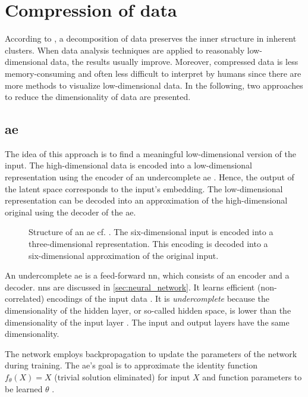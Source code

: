 \section{Compression of data}\label{sec:compression}

According to \citeauthor{clusteringDocs2020}, a decomposition of data preserves the inner structure in inherent clusters. 
When data analysis techniques are applied to reasonably low-dimensional data, the results usually improve.
Moreover, compressed data is less memory-consuming and often less difficult to interpret by humans 
since there are more methods to visualize low-dimensional data.
In the following, two approaches to reduce the dimensionality of data are presented.

\subsection{\acl*{ae}}\label{subsec:autoencoder}

The idea of this approach is to find a meaningful low-dimensional version of the input.
The high-dimensional data is encoded into a low-dimensional representation using the encoder of an undercomplete \ac{ae} \cite{autoencoder2020}.
Hence, the output of the latent space corresponds to the input's embedding. 
The low-dimensional representation can be decoded into an approximation of the high-dimensional original using the decoder of the \ac{ae}.

\begin{figure}[!htp] %
    \centering
    
    \caption[Structure of an \ac{ae}]
    {Structure of an \acs*{ae} cf. \cite{autoencoder2020}.
    The six-dimensional input is encoded into a three-dimensional representation.
    This encoding is decoded into a six-dimensional approximation of the original input.}
    \label{fig:ae}
\end{figure}

An undercomplete \ac{ae} is a feed-forward \ac{nn}, which consists of an encoder and a decoder.
\acp{nn} are discussed in \autoref{sec:neural_network}.
It learns efficient (non-correlated) encodings of the input data \cite{autoencoder2020}.
It is \textit{undercomplete} because the dimensionality of the hidden layer, or so-called hidden space, 
is lower than the dimensionality of the input layer \cite{seminar_ies}.
The input and output layers have the same dimensionality.

The network employs backpropagation to update the parameters of the network during training.
The \ac{ae}'s goal is to approximate the identity function $f_\theta(X) = X$ (trivial solution eliminated) for input $X$ and 
function parameters to be learned $\theta$ \cite{seminar_ies}.


